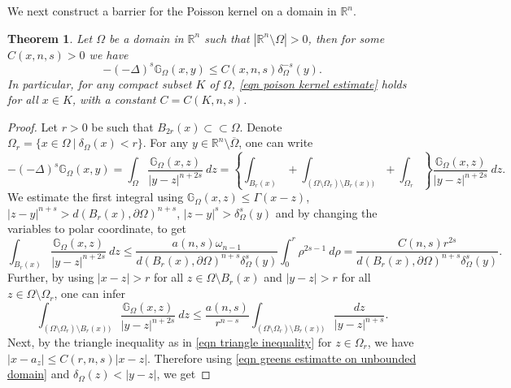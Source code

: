 \documentclass{amsart}
\newtheorem{theorem}{Theorem}[section]
\newcommand{\R}{\mathbb{R}}
\newcommand{\slap}{(-\Delta)^{s}}
\newcommand{\gk}[1]{\mathbb{G}_{#1}}
\begin{document}
We next construct a barrier for the Poisson kernel on a domain in $\R^{n}$.
\begin{theorem}\label{theorem poission behaviour}
    Let $\Omega$ be a domain in $\R^{n}$ such that $|\R^{n}\setminus \Omega|>0$, then for some $C(x,n,s)>0$ we have
    \begin{equation}\label{eqn poison kernel estimate}
        -\slap \gk{\Omega}(x,y)\leq C(x,n,s) \delta^{-s}_{\Omega}(y).
    \end{equation}
    In particular, for any compact subset $K$ of $\Omega$, \eqref{eqn poison kernel estimate} holds for all $x\in K$, with a constant $C=C(K,n,s)$.
\end{theorem}
\begin{proof}
Let $r>0$ be such that $B_{2r}(x)\subset \subset \Omega$. Denote $\Omega_{r}=\{x\in\Omega~|~\delta_{\Omega}(x)<r\}$. For any $y\in \R^{n}\setminus\overline{\Omega}$, one can write
    \begin{equation*}
        -\slap\gk{\Omega}(x,y)=\int_{\Omega}\frac{\gk{\Omega}(x,z)}{|y-z|^{n+2s}}\ dz=\left\{\int_{B_{r}(x)}+\int_{(\Omega\setminus\Omega_{r})\setminus B_{r}(x))}+\int_{\Omega_{r}}\right\}\frac{\gk{\Omega}(x,z)}{|y-z|^{n+2s}}\ dz.
    \end{equation*}
    We estimate the first integral using $\gk{\Omega}(x,z)\leq \Gamma(x-z)$, $|z-y|^{n+s}>d(B_{r}(x),\partial\Omega)^{n+s}$, $|z-y|^{s}>\delta_{\Omega}^{s}(y)$ and by changing the variables to polar coordinate, to get
    \begin{equation*}
        \int_{B_{r}(x)}\frac{\gk{\Omega}(x,z)}{|y-z|^{n+2s}}\ dz\leq \frac{a(n,s)\omega_{n-1}}{d(B_{r}(x),\partial\Omega)^{n+s}\delta^{s}_{\Omega}(y)}\int_{0}^{r}\rho^{2s-1}\ d\rho=\frac{C(n,s)r^{2s}}{d(B_{r}(x),\partial\Omega)^{n+s}\delta^{s}_{\Omega}(y)}.
    \end{equation*}
    Further, by using $|x-z|>r$ for all $z\in \Omega\setminus B_{r}(x)$ and $|y-z|>r$ for all $z\in \Omega\setminus\Omega_{r}$, one can infer 
    \begin{equation*}
      \int_{(\Omega\setminus\Omega_{r})\setminus B_{r}(x))}  \frac{\gk{\Omega}(x,z)}{|y-z|^{n+2s}}\ dz\leq \frac{a(n,s)}{r^{n-s}}\int_{(\Omega\setminus\Omega_{r})\setminus B_{r}(x))}\frac{dz}{|y-z|^{n+s}}.
    \end{equation*}
    Next, by the triangle inequality as in \eqref{eqn triangle inequality} for $z\in \Omega_{r}$, we have $|x-a_{z}|\leq C(r,n,s) |x-z|$. Therefore using \eqref{eqn greens estimatte on unbounded domain} and $\delta_{\Omega}(z)<|y-z|$, we get

\end{proof}
\end{document}
